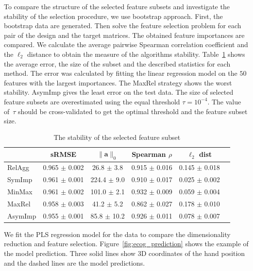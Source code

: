 \documentclass[12pt,oneside]{article}
\theoremstyle{definition}
\newcommand{\ba}{\mathbf{a}}
\begin{document}
To compare the structure of the selected feature subsets and investigate the stability of the selection procedure, we use bootstrap approach. 
First, the bootstrap data are generated. 
Then solve the feature selection problem for each pair of the design and the target matrices.
The obtained feature importances are compared. 
We calculate the average pairwise Spearman correlation coefficient and the $\ell_2$ distance to obtain the measure of the algorithms stability.
Table~\ref{tbl:stability} shows the average error, the size of the subset and the described statistics for each method. The error was calculated by fitting the linear regression model on the $50$ features with the largest importances.
The MaxRel strategy shows the worst stability.
AsymImp gives the least error on the test data. 
The size of selected feature subsets are overestimated using the equal threshold $\tau=10^{-4}$. 
The value of~$\tau$ should be cross-validated to get the optimal threshold and the feature subset size. 

\begin{table}[]
	\caption{The stability of the selected feature subset}
	\centering
	\begin{tabular}{l|ccccc}
		\hline
		& sRMSE  & $\|\ba\|_0$ & Spearman $\rho$ & $\ell_2$ dist \\ \hline
		RelAgg & 0.965 $\pm$ 0.002 & 26.8 $\pm$ 3.8 & 0.915 $\pm$ 0.016 & 0.145 $\pm$ 0.018   \\
		SymImp & 0.961 $\pm$ 0.001 & 224.4 $\pm$ 9.0 & 0.910 $\pm$ 0.017 & 0.025 $\pm$ 0.002   \\
		MinMax & 0.961 $\pm$ 0.002 & 101.0 $\pm$ 2.1& 0.932 $\pm$ 0.009 & 0.059 $\pm$ 0.004   \\
		MaxRel & 0.958 $\pm$ 0.003 & 41.2 $\pm$ 5.2 & 0.862 $\pm$ 0.027 & 0.178 $\pm$ 0.010   \\
		AsymImp & 0.955 $\pm$ 0.001 & 85.8 $\pm$ 10.2& 0.926 $\pm$ 0.011 & 0.078 $\pm$ 0.007  \\ \hline
	\end{tabular}
	\label{tbl:stability}
\end{table}

We fit the PLS regression model for the data to compare the dimensionality reduction and feature selection. 
Figure~\ref{fig:ecog_prediction} shows the example of the model prediction. Three solid lines show 3D coordinates of the hand position and the dashed lines are the model predictions.
\end{document}
